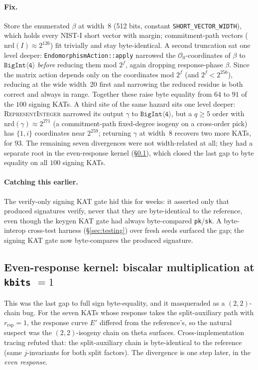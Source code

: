 \paragraph{Fix.}  Store the enumerated $\beta$ at width~8 (512 bits,
constant \texttt{SHORT\_VECTOR\_WIDTH}), which holds every NIST-I short
vector with margin; commitment-path vectors ($\mathrm{nrd}(I) \approx
2^{126}$) fit trivially and stay byte-identical.  A second truncation
sat one level deeper: \texttt{EndomorphismAction::apply} narrowed the
$\mathcal{O}_0$-coordinates of $\beta$ to $\mathtt{BigInt\langle
4\rangle}$ \emph{before} reducing them mod $2^f$, again dropping
response-phase $\beta$.  Since the matrix action depends only on the
coordinates mod $2^f$ (and $2^f < 2^{256}$), reducing at the wide
width~20 first and narrowing the reduced residue is both correct and
always in range.  Together these raise byte equality from $64$ to $91$
of the $100$ signing KATs.  A third site of the same hazard sits one
level deeper: \textsc{RepresentInteger} narrowed its output $\gamma$ to
$\mathtt{BigInt\langle 4\rangle}$, but a $q \geq 5$ order with
$\mathrm{nrd}(\gamma) \approx 2^{271}$ (a commitment-path fixed-degree
isogeny on a cross-order pick) has $\{1, i\}$ coordinates near
$2^{259}$; returning $\gamma$ at width~8 recovers two more KATs, for
$93$.  The remaining seven divergences were not width-related at all;
they had a separate root in the even-response kernel
(\S\ref{sec:bug-biscalar-2torsion}), which closed the last gap to
byte equality on all $100$ signing KATs.

\paragraph{Catching this earlier.}  The verify-only signing KAT gate
hid this for weeks: it asserted only that produced signatures verify,
never that they are byte-identical to the reference, even though the
keygen KAT gate had always byte-compared \texttt{pk}/\texttt{sk}.  A
byte-interop cross-test harness (\S\ref{sec:testing}) over fresh seeds
surfaced the gap; the signing KAT gate now byte-compares the produced
signature.

\subsection{Even-response kernel: biscalar multiplication at
  \texttt{kbits} $= 1$}
\label{sec:bug-biscalar-2torsion}

This was the last gap to full sign byte-equality, and it masqueraded as
a $(2,2)$-chain bug. For the seven KATs whose response takes the
split-auxiliary path with $r_{\mathrm{rsp}} = 1$, the response curve
$E'$ differed from the reference's, so the natural suspect was the
$(2,2)$-isogeny chain on theta surfaces. Cross-implementation tracing
refuted that: the split-auxiliary chain is byte-identical to the
reference (same $j$-invariants for both split factors). The divergence
is one step later, in the \emph{even response}.

